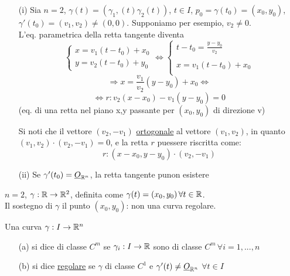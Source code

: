 \begin{osservazione}
  \begin{itemize}
    \item[(i)] Sia $n=2$, $\gamma(t) = (\gamma_1,(t)\gamma_2(t))$, $t\in I$, 
              $p_0 = \gamma(t_0) = (x_0,y_0)$, $\gamma'(t_0) = (v_1,v_2) \neq (0,0)$. 
              Supponiamo per esempio, $v_2\neq 0$. \\
              L'eq. parametrica della retta tangente diventa
              $$\left\{\begin{array}{l}
                x = v_1(t-t_0)+x_0 \\
                y = v_2(t-t_0)+y_0
              \end{array}\right. \iff \left\{\begin{array}{l}
                t-t_0 = \frac{y-y_0}{v_2} \\
                \\
                x = v_1(t-t_0) + x_0 \\
              \end{array}\right.$$
              $$\Rightarrow x = \frac{v_1}{v_2} (y-y_0) + x_0 \iff $$
              $$\iff r: v_2(x-x_0) - v_1(y-y_0) = 0$$
              (eq. di una retta nel piano x,y passante per $(x_0,y_0)$ di direzione v)
              \begin{NB}
                Si noti che il vettore $(v_2,-v_1)$ \ace \underline{ortogonale} al vettore $(v_1,v_2)$, in quanto
                $(v_1,v_2)\cdot(v_2,-v_1) = 0$, e la retta $r$ pu\aco essere riscritta come:
                $$r: (x-x_0,y-y_0)\cdot(v_2,-v_1)$$
              \end{NB}
    \item[(ii)] Se $\gamma'(t_0) = \underline{O}_{\mathbb{R}^n}$, la retta tangente pu\aco non esistere
  \end{itemize}
\end{osservazione}
\begin{example}
  $n=2$, $\gamma : \mathbb{R}\to\mathbb{R}^2$, definita come $\gamma(t) = (x_0,y_0) \, \forall t \in \mathbb{R}$.\\
  Il sostegno di $\gamma$ \ace il punto $(x_0,y_0)$: non \ace una curva regolare.
\end{example}
\begin{definition}
  Una curva $\gamma:I\to\mathbb{R}^n$
  \begin{itemize}
    \item[(a)] si dice di classe $C^m$ se $\gamma_i : I \to \mathbb{R}$ sono di classe $C^m \, \forall i = 1,...,n$
    \item[(b)] si dice \underline{regolare} se $\gamma$ \ace di classe $C^1$ e $\gamma'(t) \neq \underline{O}_{\mathbb{R}^n}$ $\forall t \in I$ 
  \end{itemize}
\end{definition}
